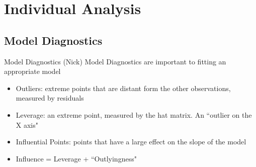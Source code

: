 \documentclass[table]{beamer}\usepackage[]{graphicx}\usepackage[]{color}
\begin{document}

\section{Individual Analysis}


\subsection{Model Diagnostics}


\begin{frame}{Model Diagnostics (Nick)}
Model Diagnostics are important to fitting an appropriate model
\begin{itemize}
  \item Outliers: extreme points that are distant form the other observations, measured by residuals
  \item Leverage: an extreme point, measured by the hat matrix. An ``outlier on the X axis"
  \item Influential Points: points that have a large effect on the slope of the model
  \item Influence = Leverage + ``Outlyingness"
\end{itemize}
\end{frame}

\end{document}
